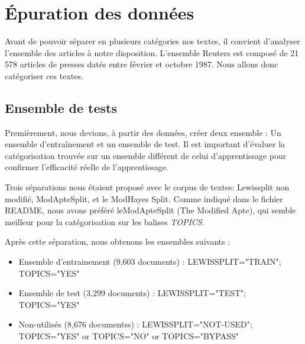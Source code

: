 \section{Épuration des données}
Avant de pouvoir séparer en plusieurs catégories nos textes, il convient d'analyser l'ensemble des articles à notre disposition. L'ensemble Reuters est composé de 21 578 articles de presses datés entre février et octobre 1987. Nous allons donc catégoriser ces textes.
\subsection{Ensemble de tests}
Premièrement, nous devions, à partir des données, créer deux ensemble : Un ensemble d'entraînement et un ensemble de test. Il est important d'évaluer la catégorisation trouvée sur un ensemble différent de celui d'apprentissage pour confirmer l'efficacité réelle de l'apprentissage.

Trois séparations  nous étaient proposé avec le corpus de textes: Lewissplit non modifié, ModApteSplit, et le ModHayes Split.
Comme indiqué dans le fichier \textsc{README}, nous avons préféré leModApteSplit (The Modified Apte), qui semble meilleur pour la catégorisation sur les balises \textit{TOPICS}.

Après cette séparation, nous obtenons les ensembles suivants : 
\begin{itemize}
\item Ensemble d'entrainement (9,603 documents) : LEWISSPLIT="TRAIN";
 TOPICS="YES"
\item Ensemble de test (3,299 documents) : LEWISSPLIT="TEST";
TOPICS="YES"
\item Non-utilisés (8,676 documentss) :   LEWISSPLIT="NOT-USED";
TOPICS="YES" or TOPICS="NO"  or TOPICS="BYPASS"
\end{itemize}
